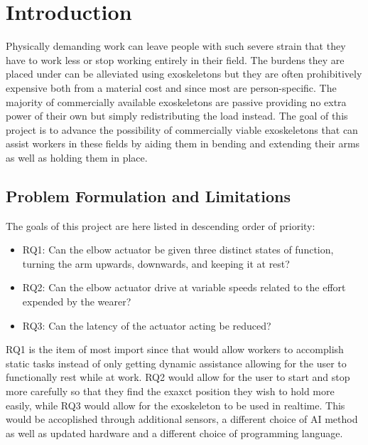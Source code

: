 \section{Introduction}
\label{section:intro}

Physically demanding work can leave people with such severe strain that they have to work less or stop working entirely in 
their field\cite{WorkDemands}. The burdens they are placed under can be alleviated using exoskeletons but they are often 
prohibitively expensive both from a material cost and since most are person-specific. The majority of commercially available 
exoskeletons are passive providing no extra power of their own but simply redistributing the load instead. The goal of this 
project is to advance the possibility of commercially viable exoskeletons that can assist workers in these fields by aiding 
them in bending and extending their arms as well as holding them in place.

\subsection{Problem Formulation and Limitations}
The goals of this project are here listed in descending order of priority:
\begin{itemize}
        
    \item RQ1: Can the elbow actuator be given three distinct states of function, turning the arm upwards, downwards, and keeping it at rest?

    \item RQ2: Can the elbow actuator drive at variable speeds related to the effort expended by the wearer?

    \item RQ3: Can the latency of the actuator acting be reduced?

\end{itemize}
RQ1 is the item of most import since that would allow workers to accomplish static tasks instead of only getting dynamic assistance 
allowing for the user to functionally rest while at work. RQ2 would allow for the user to start and stop more carefully so that they 
find the exaxct position they wish to hold more easily, while RQ3 would allow for the exoskeleton to be used in realtime.
This would be accoplished through additional sensors, a different choice of AI method as well as updated hardware and a different 
choice of programming language.




